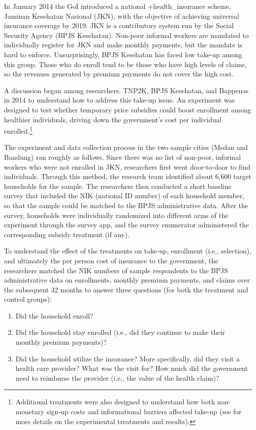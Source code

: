 \documentclass[
]{WileySix}
\providecommand{\tightlist}{%
  \setlength{\itemsep}{0pt}\setlength{\parskip}{0pt}}
\begin{document}
In January 2014 the GoI introduced a national +health\_insurance\textbar{} scheme, Jaminan Kesehatan Nasional (JKN), with the objective of achieving universal insurance coverage by 2019. JKN is a contributory system run by the Social Security Agency (BPJS Kesehatan). Non-poor informal workers are mandated to individually register for JKN and make monthly payments, but the mandate is hard to enforce. Unsurprisingly, BPJS Kesehatan has faced low take-up among this group. Those who do enroll tend to be those who have high levels of claims, so the revenues generated by premium payments do not cover the high cost.

A discussion began among researchers, TNP2K, BPJS Kesehatan, and Bappenas in 2014 to understand how to address this take-up issue. An experiment was designed to test whether temporary price subsidies could boost enrollment among healthier individuals, driving down the government's cost per individual enrolled.\footnote{Additional treatments were also designed to understand how both non-monetary sign-up costs and informational barriers affected take-up (see \citet{banerjee2019} for more details on the experimental treatments and results).}

The experiment and data collection process in the two sample cities (Medan and Bandung) ran roughly as follows. Since there was no list of non-poor, informal workers who were not enrolled in JKN, researchers first went door-to-door to find individuals. Through this method, the research team identified about 6,600 target households for the sample. The researchers then conducted a short baseline survey that included the NIK (national ID number) of each household member, so that the sample could be matched to the BPJS administrative data. After the survey, households were individually randomized into different arms of the experiment through the survey app, and the survey enumerator administered the corresponding subsidy treatment (if any).

To understand the effect of the treatments on take-up, enrollment (i.e., selection), and ultimately the per person cost of insurance to the government, the researchers matched the NIK numbers of sample respondents to the BPJS administrative data on enrollments, monthly premium payments, and claims over the subsequent 32 months to answer three questions (for both the treatment and control groups):

\begin{enumerate}
\def\labelenumi{\arabic{enumi})}
\tightlist
\item
  Did the household enroll?
\item
  Did the household stay enrolled (i.e., did they continue to make their monthly premium payments)?
\item
  Did the household utilize the insurance? More specifically, did they visit a health care provider? What was the visit for? How much did the government need to reimburse the provider (i.e., the value of the health claim)?
\end{enumerate}
\end{document}
